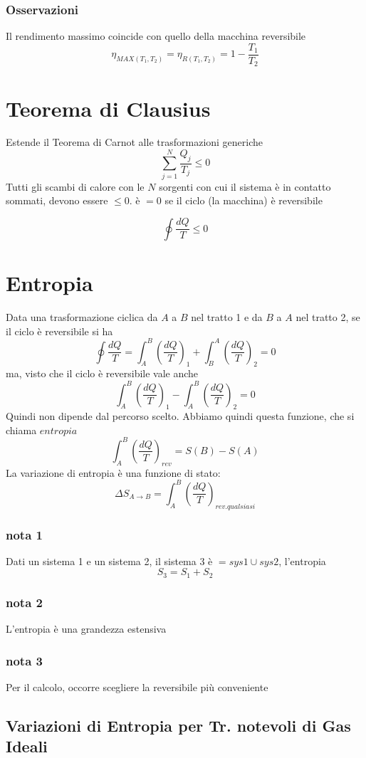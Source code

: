 \documentclass[a4paper]{report}
\begin{document}
  \subsubsection{Osservazioni}
  Il rendimento massimo coincide con quello della macchina reversibile
  \[ \eta_{MAX(T_1,T_2)} = \eta_{R(T_1,T_2)} = 1-\frac{T_1}{T_2} \]

  \section{Teorema di Clausius}
  Estende il Teorema di Carnot alle trasformazioni generiche
  \[ \sum_{j=1}^N \frac{Q_j}{T_j} \leq 0 \]
  Tutti gli scambi di calore con le $N$ sorgenti con cui il sistema è in contatto sommati, devono essere $\leq 0$. è $=0$ se il ciclo (la macchina) è reversibile

  \[ \oint \frac{dQ}{T} \leq 0 \]

  \section{Entropia}
  Data una trasformazione ciclica da $A$ a $B$ nel tratto 1 e da $B$ a $A$ nel tratto 2, se il ciclo è reversibile si ha
  \[ \oint \frac{dQ}{T} = \int_A^B (\frac{dQ}{T})_1 + \int_B^A (\frac{dQ}{T})_2 = 0\]
  ma, visto che il ciclo è reversibile vale anche
  \[ \int_A^B (\frac{dQ}{T})_1 - \int_A^B (\frac{dQ}{T})_2 = 0\]
  Quindi non dipende dal percorso scelto. Abbiamo quindi questa funzione, che si chiama $entropia$
  \[ \int_A^B (\frac{dQ}{T})_{rev} = S(B) -S(A) \]
  La variazione di entropia è una funzione di stato:
  \[ \Delta S_{A \rightarrow B} = \int_A^B (\frac{dQ}{T})_{rev. qualsiasi} \]
  \subsubsection{nota 1}
  Dati un sistema 1 e un sistema 2, il sistema 3 è $= sys1 \cup sys2$, l'entropia
  \[ S_3 = S_1 + S_2 \]
  \subsubsection{nota 2}
  L'entropia è una grandezza estensiva
  \subsubsection{nota 3}
  Per il calcolo, occorre scegliere la reversibile più conveniente
  \subsection{Variazioni di Entropia per Tr. notevoli di Gas Ideali}
\end{document}
